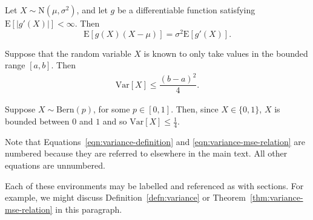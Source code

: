 \begin{lemma}
    Let $X \sim \mathrm{N}(\mu, \sigma^2)$, and let $g$ be a differentiable 
    function satisfying $\mathrm{E}[|g'(X)|] < \infty$. Then
    \begin{equation}
        \mathrm{E}[g(X)(X-\mu)] = \sigma^2 \mathrm{E}[g'(X)].
        \nonumber
    \end{equation}
\end{lemma}

\begin{proposition}
    Suppose that the random variable $X$ is known to only take values in the 
    bounded range $[a, b]$. Then  
    \begin{align}
        \mathrm{Var}[X] \leq \dfrac{(b-a)^2}{4}.
        \nonumber
    \end{align}
\end{proposition}

\begin{example}
    Suppose $X \sim \mathrm{Bern} (p)$, for some $p \in [0,1]$. Then, 
    since $X \in \{0, 1\}$, $X$ is bounded between $0$ and $1$ and so
    $\mathrm{Var}[X] \leq \tfrac{1}{4}$.
\end{example}

Note that Equations~\eqref{eqn:variance-definition} and \eqref{eqn:variance-mse-relation} are numbered because they are referred to elsewhere in the main text. All other equations are unnumbered. 

Each of these environments may be labelled and referenced as with sections. For example, we might discuss Definition~\ref{defn:variance} or Theorem~\ref{thm:variance-mse-relation} in this paragraph. 
